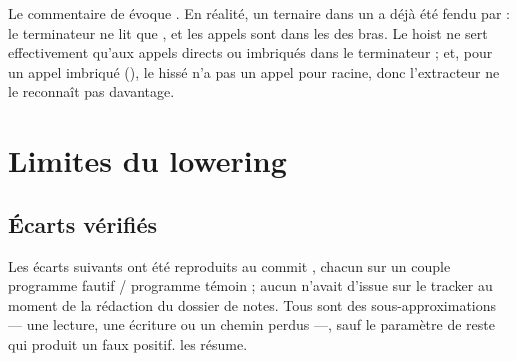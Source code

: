 \begin{remarque}
Le commentaire de  évoque . En réalité, un ternaire dans un  a déjà été fendu par  : le terminateur ne lit que , et les appels sont dans les  des bras. Le hoist ne sert effectivement qu'aux appels directs ou imbriqués dans le terminateur ; et, pour un appel imbriqué (), le  hissé n'a pas un appel pour racine, donc l'extracteur ne le reconnaît pas davantage.
\end{remarque}

\section{Limites du lowering}
\label{sec:lowering-limites}

\subsection{Écarts vérifiés}

Les écarts suivants ont été reproduits au commit \snapshotCommit{}, chacun sur un couple \og programme fautif / programme témoin\fg{} ; aucun n'avait d'issue sur le tracker au moment de la rédaction du dossier de notes. Tous sont des sous-approximations --- une lecture, une écriture ou un chemin perdus ---, sauf le paramètre de reste qui produit un faux positif.  les résume.

